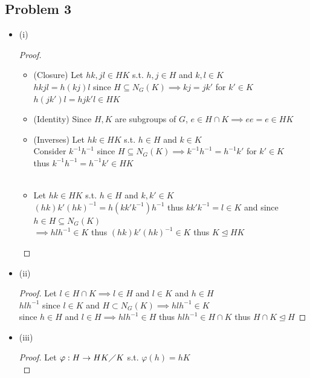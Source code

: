 \documentclass[12pt, letterpaper]{article}
\theoremstyle{definition}
\begin{document}
\newpage
\subsection*{Problem 3}
\begin{itemize}
    \item (i)
    \begin{proof}
        \phantom{text}
        \begin{itemize}
            \item (Closure) Let $hk,jl \in HK$ s.t. $h,j \in H$ and $k,l \in K$\\
            $hkjl=h(kj)l$ since $H \subseteq N_G(K) \implies kj=jk'$ for $k' \in K$\\
            $h(jk')l=hjk'l \in HK$
            \item (Identity) Since $H,K$ are subgroups of $G$, $e\in H\cap K \implies ee=e\in HK$
            \item (Inverses) Let $hk \in HK$ s.t. $h\in H$ and $k \in K$\\
            Consider $k^{-1}h^{-1}$ since $H \subseteq N_G(K) \implies k^{-1}h^{-1}=h^{-1}k'$ for $k' \in K$\\
            thus $k^{-1}h^{-1}=h^{-1}k'\in HK$\\
            \phantom{text}\\
            \item Let $hk \in HK$ s.t. $h\in H$ and $k,k' \in K$\\
            $(hk)k'(hk)^{-1}=h(kk'k^{-1})h^{-1}$ thus $kk'k^{-1}=l \in K$ and since $h \in H \subseteq N_G(K)$\\ 
            $\implies hlh^{-1} \in K$ thus $(hk)k'(hk)^{-1} \in K$ thus $K \unlhd HK$
        \end{itemize}
    \end{proof}
    \item (ii)
    \begin{proof}
        Let $l \in H \cap K \implies l \in H$ and $l \in K$ and $h \in H$\\
        $hlh^{-1}$ since $l \in K$ and $H \subset N_G(K) \implies hlh^{-1} \in K$\\
        since $h \in H$ and $l \in H \implies hlh^{-1} \in H$ thus $hlh^{-1} \in H \cap K$ thus $H\cap K \unlhd H$
    \end{proof}
    \item (iii)
    \begin{proof}
        Let $\varphi: H \rightarrow HK \diagup K$ s.t. $\varphi(h)=hK$\\

\end{proof}
\end{itemize}
\end{document}
